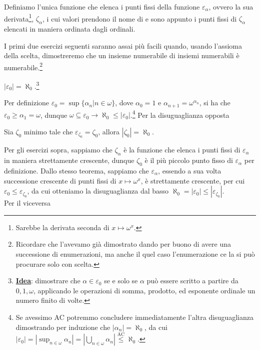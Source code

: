 \begin{definition}
	Definiamo l'unica funzione che elenca i punti fissi della funzione $\varepsilon_\alpha$, ovvero la sua derivata\footnote{Sarebbe la derivata seconda di $x \mapsto \omega^x$.}, $\zeta_\alpha$, i cui valori prendono il nome di  e sono appunto i punti fissi di $\zeta_\alpha$ elencati in maniera ordinata dagli ordinali.
\end{definition}

I primi due esercizi seguenti saranno assai più facili quando, usando l'assioma della scelta, dimostreremo che un insieme numerabile di insiemi numerabili è numerabile.\footnote{Ricordare che l'avevamo già dimostrato dando per buono di avere una successione di enumerazioni,
ma anche il quel caso l'enumerazione ce la si può procurare solo con scelta.}

\begin{exercise}[\textcolor{red}{$\star$ Difficile senza leggere l'idea sotto}]
	$|\varepsilon_0| = \aleph_0$.\footnote{\underline{\textbf{Idea}}: dimostrare che $\alpha \in \varepsilon_0$ se e solo se $\alpha$ può essere scritto a partire da $0,1,\omega$, applicando le operazioni di somma, prodotto, ed esponente ordinale un numero finito di volte.}
\end{exercise}

\begin{soln}
	Per definizione $\varepsilon_0 = \sup\{\alpha_n | n \in \omega\}$, dove $\alpha_0 = 1$ e $\alpha_{n+1}=\omega^{\alpha_n}$, si ha che $\varepsilon_0 \geq \alpha_1 = \omega$, dunque $\omega \subseteq \varepsilon_0 \to \aleph_0 \leq |\varepsilon_0|$.\footnote{Se avessimo AC
	potremmo concludere immediatamente l'altra disuguaglianza dimostrando per induzione che $|\alpha_n| = \aleph_0$, da cui $|\varepsilon_0| = |\sup_{n \in \omega} \alpha_n| = |\bigcup_{n \in \omega} \alpha_n| \overset{\text{AC}}{\leq} \aleph_0$.} Per la
	disuguaglianza opposta
\end{soln}

\begin{exercise}[\textcolor{red}{$\star \star$ Ostico}]
	Sia $\zeta_0$ minimo tale che $\varepsilon_{\zeta_0} = \zeta_0$, allora $|\zeta_0| = \aleph_0$.
\end{exercise}

\begin{soln}
	Per gli esercizi sopra, sappiamo che $\zeta_\alpha$ è la funzione che elenca i punti fissi di $\varepsilon_\alpha$ in maniera strettamente crescente, dunque $\zeta_0$ è il più piccolo punto fisso di $\varepsilon_\alpha$ per definizione.
	Dallo stesso teorema, sappiamo che $\varepsilon_\alpha$, essendo a sua volta successione crescente di punti fissi di $x \mapsto \omega^x$, è strettamente crescente, per cui $\varepsilon_0 \leq \varepsilon_{\zeta_0}$, da cui otteniamo la disuguaglianza dal basso $\aleph_0 = |\varepsilon_0| \leq |\varepsilon_{\zeta_0}|$.\\
	Per il viceversa
\end{soln}

